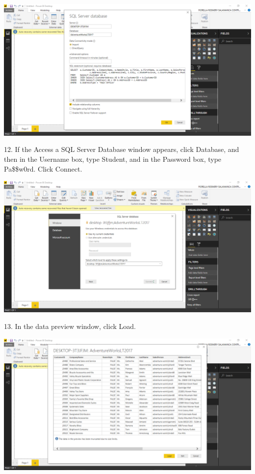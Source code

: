 	\begin{center}
	\includegraphics[width=17cm]{./Imagenes/Ejercicio1/Tarea2/5}
	\end{center}	

12. If the Access a SQL Server Database window appears, click Database, and then in the Username box, type Student, and in the Password box, type Pa\$\$w0rd. Click Connect.\\

	\begin{center}
	\includegraphics[width=17cm]{./Imagenes/Ejercicio1/Tarea2/6}
	\end{center}	

13. In the data preview window, click Load.\\

	\begin{center}
	\includegraphics[width=17cm]{./Imagenes/Ejercicio1/Tarea2/7}
	\end{center}	


